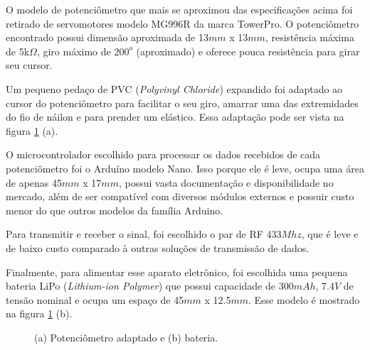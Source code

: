 \documentclass[
	12pt,				%
	openright,			%
	oneside,			%
	a4paper,			%
	english,			%
	brazil				%
	]{abntex2}
\begin{document}
			O modelo de potenciômetro que mais se aproximou das especificações acima foi retirado de servomotores modelo MG996R da marca TowerPro. O potenciômetro encontrado possui dimensão aproximada de 13$mm$ x 13$mm$, resistência máxima de 5k$\Omega$, giro máximo de $200^{o}$ (aproximado) e oferece pouca resistência para girar seu cursor. 

			Um pequeno pedaço de PVC (\textit{Polyvinyl Chloride}) expandido foi adaptado ao cursor do potenciômetro para facilitar o seu giro, amarrar uma das extremidades do fio de náilon e para prender um elástico. Essa adaptação pode ser vista na figura \ref{Fig:potentiometer-and-battery} (a).

			O microcontrolador escolhido para processar os dados recebidos de cada potenciômetro foi o Arduíno modelo Nano. Isso porque ele é leve, ocupa uma área de apenas 45$mm$ x 17$mm$, possui vasta documentação e disponibilidade no mercado, além de ser compatível com diversos módulos externos e possuir custo menor do que outros modelos da família Arduino.

			Para transmitir e receber o sinal, foi escolhido o par de RF 433$Mhz$, que é leve e de baixo custo comparado à outras soluções de transmissão de dados.

			Finalmente, para alimentar esse aparato eletrônico, foi escolhida uma pequena bateria LiPo (\textit{Lithium-ion Polymer}) que possui capacidade de 300$mAh$, 7.4$V$ de tensão nominal e ocupa um espaço de 45$mm$ x 12.5$mm$. Esse modelo é mostrado na figura \ref{Fig:potentiometer-and-battery} (b).


	\begin{figure}[!htb]
		 \centering
		 \caption{ (a) Potenciômetro adaptado e (b) bateria.}
		 \centering
		 \label{Fig:potentiometer-and-battery}
	 \end{figure}
\end{document}
